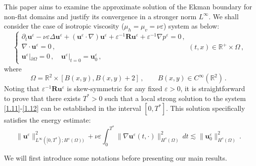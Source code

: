 \documentclass[pdflatex,sn-mathphys-num]{sn-jnl}%
\theoremstyle{thmstyleone}%
\theoremstyle{thmstyletwo}%
\theoremstyle{thmstylethree}%
\theoremstyle{thmstyletwo}
\begin{document}
 





This paper aims to examine the approximate solution of the Ekman boundary for non-flat domains and justify its convergence in a stronger norm \(L^\infty\).
We shall consider the case of isotropic viscosity ($\mu_h=\mu_v=\nu\varepsilon$) system as below:
\begin{equation}\label{1.11}
	\begin{cases}
		\partial_t \boldsymbol{u}^\varepsilon-\nu\varepsilon \Delta \boldsymbol{u}^\varepsilon+(\boldsymbol{u}^\varepsilon \cdot \nabla)\boldsymbol{u}^\varepsilon+\varepsilon^{-1}\boldsymbol{R}\boldsymbol{u}^\varepsilon+\varepsilon^{-1}\nabla p^\varepsilon=0\,,\\
		\nabla\cdot \boldsymbol{u}^\varepsilon=0\,,\\
		\boldsymbol{u}^\varepsilon|_{\partial\Omega}=0\,,\quad \boldsymbol{u}^\varepsilon|_{t=0}=\boldsymbol{u}_0^\varepsilon\,,
	\end{cases}  (t,x)\in \mathbb{R}^+\times \Omega\,,
\end{equation}
where 
\begin{equation}\label{1.12}
	\Omega=\mathbb{R}^2 \times [B(x, y), B(x, y) + 2]\,,\qquad  B(x,y)\in C^\infty(\mathbb{R}^2)\,.
\end{equation}
Noting that $\varepsilon^{-1}\boldsymbol{R}\boldsymbol{u}^\varepsilon$ is skew-symmetric for any fixed $\varepsilon > 0$, it is straightforward to prove that there exists  $T^*>0$ such that a local strong solution to the system \eqref{1.11}-\eqref{1.12} can be established in the interval $[0, T^*]$. This solution specifically satisfies the energy estimate:
\begin{equation}\label{1.13}
	\lVert\boldsymbol{u}^\varepsilon\rVert_{{L}^\infty([0,T^*); {H}^s(\Omega))}^2+\nu\varepsilon\int_0^{T^*}\lVert\nabla\boldsymbol{u}^\varepsilon(t,\cdot)\rVert_{H^s(\Omega)}^2\,dt \lesssim \lVert\boldsymbol{u}^\varepsilon_{0}\rVert_{H^s(\Omega)}^2\,.
\end{equation}

We will first introduce some notations before presenting our main results.
\end{document}
